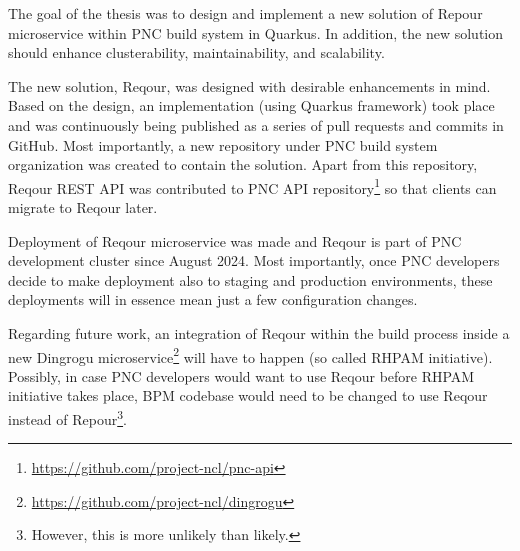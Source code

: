 \documentclass[../main.tex]{subfiles}
\begin{document}
The goal of the thesis was to design and implement a new solution of Repour microservice\cite{repour} within PNC build system in Quarkus. In addition, the new solution should enhance clusterability, maintainability, and scalability.

The new solution, Reqour, was designed with desirable enhancements in mind. Based on the design, an implementation (using Quarkus framework) took place and was continuously being published as a series of pull requests and commits in GitHub. Most importantly, a new repository under PNC build system organization was created to contain the solution\cite{reqour}. Apart from this repository, Reqour REST API was contributed to PNC API repository\footnote{\url{https://github.com/project-ncl/pnc-api}} so that clients can migrate to Reqour later.

Deployment of Reqour microservice was made and Reqour is part of PNC development cluster since August 2024. Most importantly, once PNC developers decide to make deployment also to staging and production environments, these deployments will in essence mean just a few configuration changes.

Regarding future work, an integration of Reqour within the build process inside a new Dingrogu microservice\footnote{\url{https://github.com/project-ncl/dingrogu}} will have to happen (so called RHPAM initiative). Possibly, in case PNC developers would want to use Reqour before RHPAM initiative takes place, BPM codebase would need to be changed to use Reqour instead of Repour\footnote{However, this is more unlikely than likely.}.
\end{document}
